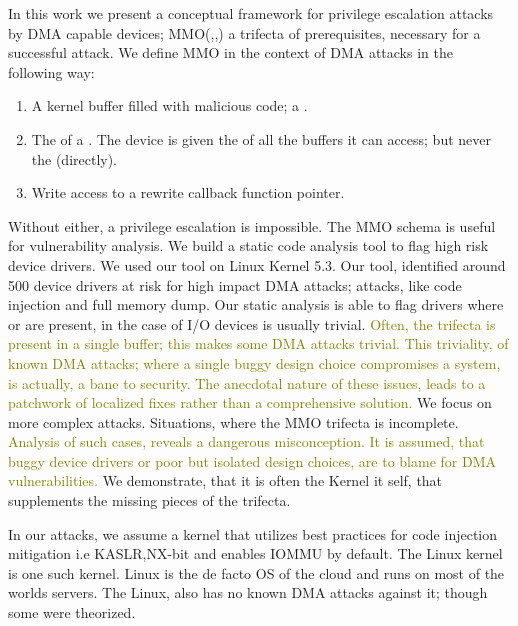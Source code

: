 In this work we present a conceptual framework for privilege escalation attacks by DMA capable devices; MMO(\means,\motivation,\oportunity) a trifecta of prerequisites, necessary for a successful attack. We define MMO in the context of DMA attacks in the following way: \begin{enumerate}
    \item \motivation A kernel buffer filled with malicious code; a \mabaf.
    \item \means The \kva of a \mabaf. The device is given the \iova of all the buffers it can access; but never the \kva (directly).
    \item \oportunity Write access to a rewrite callback function pointer.
\end{enumerate} Without either, a privilege escalation is impossible. The MMO schema is useful for vulnerability analysis. We build a static code analysis tool to flag high risk device drivers. We used our tool on Linux Kernel 5.3. Our tool, identified around 500 device drivers at risk for high impact DMA attacks; attacks, like code injection and full memory dump. Our static analysis is able to flag drivers where \means or \oportunity are present, in the case of I/O devices \motivation is usually trivial. 
\textcolor{olive}{Often, the trifecta is present in a single buffer; this makes some DMA attacks trivial\cite{thunder}. This triviality, of known DMA attacks; where a single buggy design choice compromises a system, is actually, a bane to security. The anecdotal nature of these issues, leads to a patchwork of localized fixes rather than a comprehensive solution.} We focus on more complex attacks. Situations, where the MMO trifecta is incomplete. \textcolor{olive}{Analysis of such cases, reveals a dangerous misconception. It is assumed, that buggy device drivers or poor but isolated design choices, are to blame for DMA vulnerabilities.} We demonstrate, that it is often the Kernel it self, that supplements the missing pieces of the trifecta. 

In our attacks, we assume a kernel that utilizes best practices for code injection mitigation i.e KASLR,NX-bit and enables IOMMU by default. The Linux kernel is one such kernel. Linux is the de facto OS of the cloud and runs on most of the worlds servers. The Linux, also has no known DMA attacks against it; though some were theorized\cite{MMT16,thunder}.


